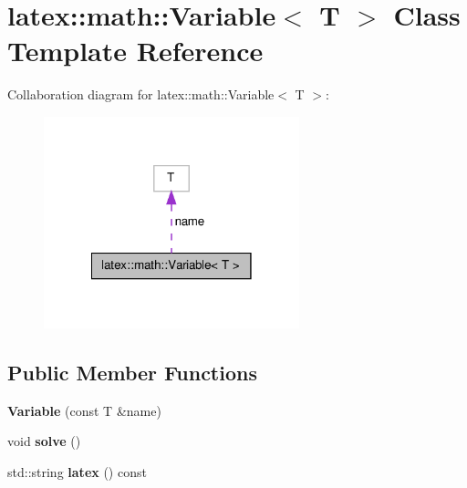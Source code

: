 \hypertarget{classlatex_1_1math_1_1Variable}{\section{latex\-:\-:math\-:\-:\-Variable$<$ \-T $>$ \-Class \-Template \-Reference}
\label{classlatex_1_1math_1_1Variable}
}


\-Collaboration diagram for latex\-:\-:math\-:\-:\-Variable$<$ \-T $>$\-:
\nopagebreak
\begin{figure}[H]
\begin{center}
\leavevmode
\includegraphics[width=210pt]{classlatex_1_1math_1_1Variable__coll__graph}
\end{center}
\end{figure}
\subsection*{\-Public \-Member \-Functions}
\begin{DoxyCompactItemize}
\item 
\hypertarget{classlatex_1_1math_1_1Variable_a2844e58e3a136631a4180811d6773f01}{{\bfseries \-Variable} (const \-T \&name)}\label{classlatex_1_1math_1_1Variable_a2844e58e3a136631a4180811d6773f01}

\item 
\hypertarget{classlatex_1_1math_1_1Variable_a3b9a17bd28ddfaf85c5634e6a8c7144d}{void {\bfseries solve} ()}\label{classlatex_1_1math_1_1Variable_a3b9a17bd28ddfaf85c5634e6a8c7144d}

\item 
\hypertarget{classlatex_1_1math_1_1Variable_adcd90cb19f6793a54b6571cc30d42e07}{std\-::string {\bfseries latex} () const }\label{classlatex_1_1math_1_1Variable_adcd90cb19f6793a54b6571cc30d42e07}

\end{DoxyCompactItemize}
